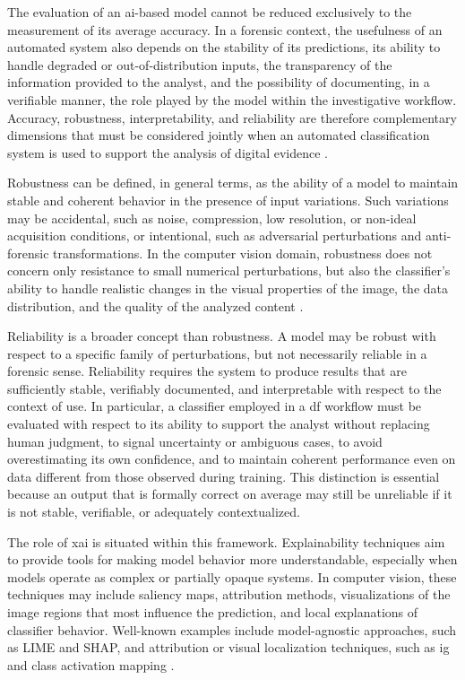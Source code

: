 The evaluation of an \gls{ai}-based model cannot be reduced exclusively to the
measurement of its average accuracy. In a forensic context, the usefulness of an
automated system also depends on the stability of its predictions, its ability
to handle degraded or out-of-distribution inputs, the transparency of the
information provided to the analyst, and the possibility of documenting, in a
verifiable manner, the role played by the model within the investigative
workflow. Accuracy, robustness, interpretability, and reliability are therefore
complementary dimensions that must be considered jointly when an automated
classification system is used to support the analysis of digital evidence
\cite{Adadi2018,Doshi-Velez2017}.

Robustness can be defined, in general terms, as the ability of a model to
maintain stable and coherent behavior in the presence of input variations. Such
variations may be accidental, such as noise, compression, low resolution, or
non-ideal acquisition conditions, or intentional, such as adversarial
perturbations and anti-forensic transformations. In the computer vision domain,
robustness does not concern only resistance to small numerical perturbations,
but also the classifier's ability to handle realistic changes in the visual
properties of the image, the data distribution, and the quality of the analyzed
content \cite{hendrycks2019benchmarking,ford2019adversarial}.

Reliability is a broader concept than robustness. A model may be robust with
respect to a specific family of perturbations, but not necessarily reliable in a
forensic sense. Reliability requires the system to produce results that are
sufficiently stable, verifiably documented, and interpretable with respect to the
context of use. In particular, a classifier employed in a \gls{df} workflow must
be evaluated with respect to its ability to support the analyst without
replacing human judgment, to signal uncertainty or ambiguous cases, to avoid
overestimating its own confidence, and to maintain coherent performance even on
data different from those observed during training. This distinction is
essential because an output that is formally correct on average may still be
unreliable if it is not stable, verifiable, or adequately contextualized.

The role of \gls{xai} is situated within this framework. Explainability
techniques aim to provide tools for making model behavior more understandable,
especially when models operate as complex or partially opaque systems. In
computer vision, these techniques may include saliency maps, attribution
methods, visualizations of the image regions that most influence the prediction,
and local explanations of classifier behavior. Well-known examples include
model-agnostic approaches, such as LIME and SHAP, and attribution or visual
localization techniques, such as \gls{ig} and class activation mapping
\cite{Ribeiro2016,Lundberg2017,Sundararajan2017,Zhou2016}.

